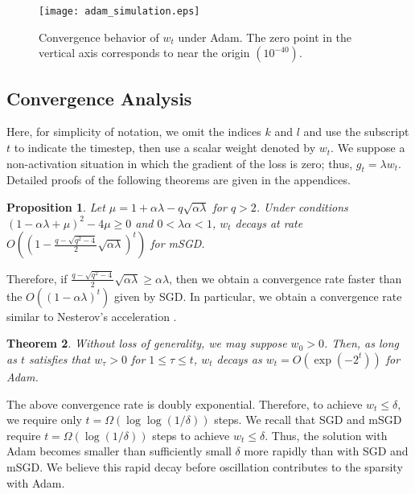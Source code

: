 \documentclass[conference]{IEEEtran}
\begin{document}
\begin{figure}[tb] 
	\centerline{\texttt{[image: adam\_simulation.eps]}}
	\caption{Convergence behavior of $w_t$ under Adam. The zero point in the vertical axis corresponds to near the origin $(10^{-40})$.}
	\label{fig:adam_simulation}
\end{figure}

\subsection{Convergence Analysis}\label{subsec:convergence_analysis}
Here, for simplicity of notation, we omit the indices $k$ and $l$ and use the subscript $t$ to indicate the timestep, then use a scalar weight denoted by $w_t$.
We suppose a non-activation situation in which the gradient of the loss is zero; thus, $g_t = \lambda w_t$. 
Detailed proofs of the following theorems are given in the appendices.
\theoremstyle{plain}
\newtheorem{thm}{Theorem}[section]
\newtheorem{lem}[thm]{Proposition}
\newtheorem{prop}[thm]{Proposition}
\begin{prop}\label{prop:msgd}
Let $\mu = 1 + \alpha \lambda - q \sqrt{\alpha \lambda}$ for $q > 2$. Under conditions $(1-\alpha \lambda + \mu)^2 - 4\mu \geq 0$ and $0 < \lambda \alpha < 1$, 
$w_t$ decays at rate $O\left( \left(1 - \frac{q - \sqrt{q^2 - 4}}{2} \sqrt{\alpha \lambda}  \right)^t \right)$ for mSGD. \\
\end{prop}
\noindent Therefore, if $\frac{q - \sqrt{q^2 - 4}}{2} \sqrt{\alpha \lambda} \geq \alpha \lambda$, then 
we obtain a convergence rate faster than the $O\left( \left(1 - \alpha \lambda  \right)^t \right)$ given by SGD.
In particular, we obtain a convergence rate similar to Nesterov's acceleration \cite{Nesterov_2004}. 

\begin{thm}\label{thm:adam}
Without loss of generality, we may suppose $w_0 > 0$. Then, as long as $t$ satisfies that $w_\tau > 0$ for $1 \leq \tau \leq t$,
$w_t$ decays as $w_t = O\left( \exp \left( -2^t \right) \right )$ for Adam.
\end{thm}
\noindent The above convergence rate is doubly exponential. Therefore, to achieve 
$
w_{t} \leq \delta,
$
we require only 
$
t= \Omega(\log\log(1/\delta))
$
steps. We recall that SGD and mSGD require
$
t = \Omega(\log(1/\delta))
$
steps to achieve $w_{t} \leq \delta$. 
Thus, the solution with Adam becomes smaller than sufficiently small $\delta$ more rapidly than with SGD and mSGD. 
We believe this rapid decay before oscillation contributes to the sparsity with Adam.
\end{document}
